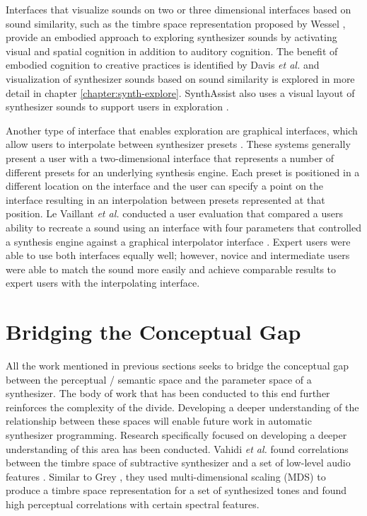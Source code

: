 Interfaces that visualize sounds on two or three dimensional interfaces based on sound similarity, such as the timbre space representation proposed by Wessel \cite{wessel1979timbre}, provide an embodied approach to exploring synthesizer sounds by activating visual and spatial cognition in addition to auditory cognition. The benefit of embodied cognition to creative practices is identified by Davis \textit{et al.} \cite{davis2013toward} and visualization of synthesizer sounds based on sound similarity is explored in more detail in chapter \ref{chapter:synth-explore}. SynthAssist also uses a visual layout of synthesizer sounds to support users in exploration \cite{cartwright2014synthassist}.

Another type of interface that enables exploration are graphical interfaces, which allow users to interpolate between synthesizer presets \cite{gibson2020analyzing}. These systems generally present a user with a two-dimensional interface that represents a number of different presets for an underlying synthesis engine. Each preset is positioned in a different location on the interface and the user can specify a point on the interface resulting in an interpolation between presets represented at that position. Le Vaillant \textit{et al.} conducted a user evaluation that compared a users ability to recreate a sound using an interface with four parameters that controlled a synthesis engine against a graphical interpolator interface \cite{le2020analytic}. Expert users were able to use both interfaces equally well; however, novice and intermediate users were able to match the sound more easily and achieve comparable results to expert users with the interpolating interface.

\section{Bridging the Conceptual Gap}
All the work mentioned in previous sections seeks to bridge the conceptual gap between the perceptual / semantic space and the parameter space of a synthesizer. The body of work that has been conducted to this end further reinforces the complexity of the divide. Developing a deeper understanding of the relationship between these spaces will enable future work in automatic synthesizer programming. Research specifically focused on developing a deeper understanding of this area has been conducted. Vahidi \textit{et al.} found correlations between the timbre space of subtractive synthesizer and a set of low-level audio features \cite{vahidi2020timbre}. Similar to Grey \cite{grey1977multidimensional}, they used multi-dimensional scaling (MDS) to produce a timbre space representation for a set of synthesized tones and found high perceptual correlations with certain spectral features. 

